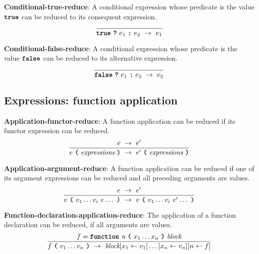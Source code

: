 \vspace{10mm}
\textbf{Conditional-true-reduce}: A conditional
expression whose predicate is the value
$\textbf{\texttt{true}}$
can be reduced to its consequent expression.
\[
\frac{
}{
  \textbf{\texttt{true}}\  \textbf{\texttt{?}}\ e_1\ \textbf{\texttt{:}}\ e_2
  \ \rightarrow \ 
  e_1
}
\]

\vspace{10mm}
\textbf{Conditional-false-reduce}: A conditional
expression whose predicate is the value
$\textbf{\texttt{false}}$
can be reduced to its alternative expression.
\[
\frac{
}{
  \textbf{\texttt{false}}\  \textbf{\texttt{?}}\ e_1\ \textbf{\texttt{:}}\ e_2
  \ \rightarrow \ 
  e_2
}
\]


\subsection*{Expressions: function application}

\textbf{Application-functor-reduce}: A function application
can be reduced if its functor expression can be reduced.
\[
\frac{
  e \ \rightarrow \ e'
}{
  e\  \textbf{\texttt{(}}\ \textit{expressions} \ \textbf{\texttt{)}}
  \ \rightarrow \ 
  e'\  \textbf{\texttt{(}}\ \textit{expressions} \ \textbf{\texttt{)}}
}
\]


\vspace{10mm}
\textbf{Application-argument-reduce}: A function application
can be reduced if one of its argument expressions can be reduced and all
preceding arguments are values.
\[
\frac{
  e \ \rightarrow \ e'
}{
  v\  \textbf{\texttt{(}}\ v_1 \ldots v_i \ e \ldots\ \textbf{\texttt{)}}
  \ \rightarrow \ 
  v\  \textbf{\texttt{(}}\ v_1 \ldots v_i \ e' \ldots\ \textbf{\texttt{)}}
}
\]



\vspace{10mm}
\textbf{Function-declaration-application-reduce}:
The application of a function declaration
can be reduced, if all
arguments are values. 
\[
\frac{
  f = \textbf{\texttt{function}}\  \textit{n} \ 
                 \textbf{\texttt{(}}\  x_1 \ldots x_n
                 \ \textbf{\texttt{)}}\ \textit{block}
}{
  f\ \textbf{\texttt{(}}\ v_1 \ldots v_n\ \textbf{\texttt{)}}
  \ \rightarrow \ 
  \textit{block} [x_1 \leftarrow v_1]\ldots[x_n \leftarrow v_n]
  [n \leftarrow f]
}
\]









    
